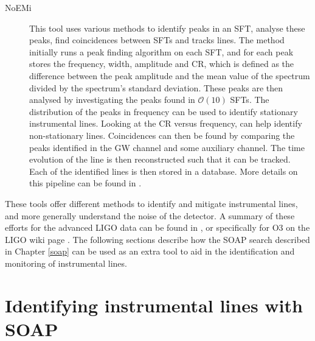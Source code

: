 \begin{description}
	
	\item[\Gls{NoEMi}] This tool uses various methods to identify peaks in an \gls{SFT}, analyse these peaks, find coincidences between \glspl{SFT} and tracks lines. 
	The method initially runs a peak finding algorithm on each \gls{SFT}, and for each peak stores the frequency, width, amplitude and \gls{CR}, which is defined as the difference between the peak amplitude and the mean value of the spectrum divided by the spectrum's standard deviation.
	These peaks are then analysed by investigating the peaks found in $\mathcal{O}(10)$ \glspl{SFT}. 
	The distribution of the peaks in frequency can be used to identify stationary instrumental lines. 
	Looking at the \gls{CR} versus frequency, can help identify non-stationary lines.
	Coincidences can then be found by comparing the peaks identified in the \gls{GW} channel and some auxiliary channel. 
	The time evolution of the line is then reconstructed such that it can be tracked.
	Each of the identified lines is then stored in a database.
	More details on this pipeline can be found in \citep{accadia2012NoEMiNoise}.

	
\end{description}


These tools offer different methods to identify and mitigate instrumental lines, and more generally understand the noise of the detector. A summary of these efforts for
the advanced \gls{LIGO} data can be found in
\citep{covas2018IdentificationMitigation}, or specifically for O3 on the \gls{LIGO} wiki page \citep{O3Lines}. The following
sections describe how the SOAP search described in Chapter \ref{soap} can be used
as an extra tool to aid in the identification and monitoring of instrumental
lines.


\section{\label{detchar:soap}Identifying instrumental lines with SOAP}

